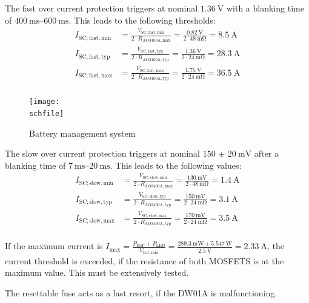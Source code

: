 The fast over current protection triggers at nominal $\qty{1.36}{\V}$ with a blanking time of $\qtyrange{400}{600}{\ms}$. This leads to the following thresholds: 
\begin{align}
	I_\mathrm{SC;fast,min} &= \frac{V_\mathrm{SC,fast,min}}{2\cdot R_\mathrm{AO3400A,max}}=\frac{\qty{0.82}{\V}}{2\cdot\qty{48}{\milli\ohm}}=\qty{8.5}{\A}\\
		I_\mathrm{SC;fast,typ} &= \frac{V_\mathrm{SC,fast,typ}}{2\cdot R_\mathrm{AO3400A,typ}}=\frac{\qty{1.36}{\V}}{2\cdot\qty{24}{\milli\ohm}}=\qty{28.3}{\A}\\
		I_\mathrm{SC;fast,max} &= \frac{V_\mathrm{SC,fast,max}}{2\cdot R_\mathrm{AO3400A,typ}}=\frac{\qty{1.75}{\V}}{2\cdot\qty{24}{\milli\ohm}}=\qty{36.5}{\A}\\
\end{align}


\begin{figure}[h!]
    \centering
    \texttt{[image: \\schfile]}
    \caption{Battery management system}
    \label{fig_bms}
\end{figure}

The slow over current protection triggers at nominal $\qty{150(20)}{\milli\V}$ after a blanking time of $\qtyrange{7}{20}{\ms}$. This leads to the following values: 
\begin{align}
	I_\mathrm{SC;slow,min} &= \frac{V_\mathrm{SC,slow,min}}{2\cdot R_\mathrm{AO3400A,max}}=\frac{\qty{130}{\milli\V}}{2\cdot\qty{48}{\milli\ohm}}=\qty{1.4}{\A}\\
		I_\mathrm{SC;slow,typ} &= \frac{V_\mathrm{SC,slow,typ}}{2\cdot R_\mathrm{AO3400A,typ}}=\frac{\qty{150}{\milli\V}}{2\cdot\qty{24}{\milli\ohm}}=\qty{3.1}{\A}\\
		I_\mathrm{SC;slow,max} &= \frac{V_\mathrm{SC,slow,max}}{2\cdot R_\mathrm{AO3400A,typ}}=\frac{\qty{170}{\milli\V}}{2\cdot\qty{24}{\milli\ohm}}=\qty{3.5}{\A}\\
\end{align}

If the maximum current is $I_\mathrm{max}=\frac{P_\mathrm{ESP}+P_\mathrm{LED}}{V_\mathrm{bat,min}}=\frac{\qty{289.3}{\milli\W} + \qty{5.547}{\W}}{\qty{2.5}{\V}}=\qty{2.33}{\A}$, the current threshold is exceeded, if the resistance of both MOSFETS is at the maximum value. This must be extensively tested. 

The resettable fuse acts as a last resort, if the DW01A is malfunctioning.

\FloatBarrier

